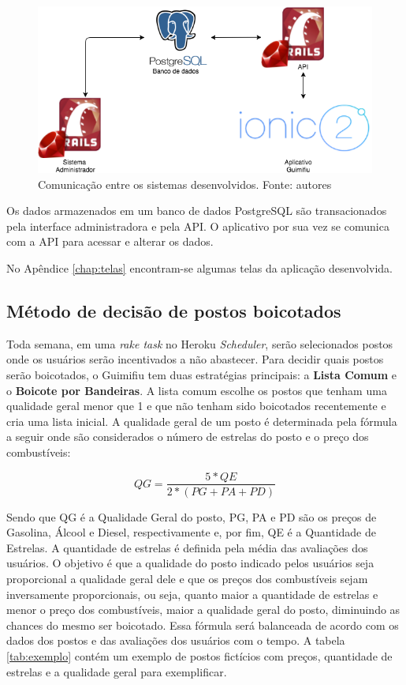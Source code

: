 \begin{figure}[H]
    \centering
    \includegraphics[scale=0.5]{figuras/comunicacao_sistemas.png}
    \caption[Comunicação entre os sistemas desenvolvidos.]{Comunicação entre os sistemas desenvolvidos. Fonte: autores}
    \label{img:comunicacaosistemas}
\end{figure}

Os dados armazenados em um banco de dados PostgreSQL são transacionados pela interface administradora e pela API. O aplicativo por sua vez se comunica com a API para acessar e alterar os dados.

No Apêndice \ref{chap:telas} encontram-se algumas telas da aplicação desenvolvida.

\subsection{Método de decisão de postos boicotados}
Toda semana, em uma \textit{rake task} no Heroku \textit{Scheduler}, serão selecionados postos onde os usuários serão incentivados a não abastecer. Para decidir quais postos serão boicotados, o Guimifiu tem duas estratégias principais: a \textbf{Lista Comum} e o \textbf{Boicote por Bandeiras}. A lista comum escolhe os postos que tenham uma qualidade geral menor que 1 e que não tenham sido boicotados recentemente e cria uma lista inicial. A qualidade geral de um posto é determinada pela fórmula a seguir onde são considerados o número de estrelas do posto e o preço dos combustíveis:

\begin{equation}
\label{Equação para cálculo de qualidade geral do Combustível}
	QG = \frac{5*QE}{2*(PG + PA + PD)}
\end{equation}

Sendo que QG é a Qualidade Geral do posto, PG, PA e PD são os preços de Gasolina, Álcool e Diesel, respectivamente e, por fim, QE é a Quantidade de Estrelas. A quantidade de estrelas é definida pela média das avaliações dos usuários. O objetivo é que a qualidade do posto indicado pelos usuários seja proporcional a qualidade geral dele e que os preços dos combustíveis sejam inversamente proporcionais, ou seja, quanto maior a quantidade de estrelas e menor o preço dos combustíveis, maior a qualidade geral do posto, diminuindo as chances do mesmo ser boicotado. Essa fórmula será balanceada de acordo com os dados dos postos e das avaliações dos usuários com o tempo. A tabela \ref{tab:exemplo} contém um exemplo de postos fictícios com preços, quantidade de estrelas e a qualidade geral para exemplificar.

